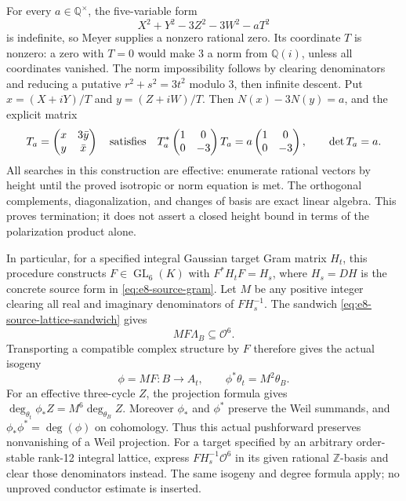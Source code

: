 For every \(a\in\mathbb Q^\times\), the five-variable form
\[
 X^2+Y^2-3Z^2-3W^2-aT^2
\]
is indefinite, so Meyer supplies a nonzero rational zero.
Its coordinate \(T\) is nonzero: a zero with \(T=0\) would make
3 a norm from \(\mathbb Q(i)\), unless all coordinates vanished.
The norm impossibility follows by clearing denominators and reducing
a putative \(r^2+s^2=3t^2\) modulo 3, then infinite descent.
Put \(x=(X+iY)/T\) and \(y=(Z+iW)/T\). Then
\(N(x)-3N(y)=a\), and the explicit matrix
\begin{equation}\label{eq:e8-binary-transport}
 T_a=\begin{pmatrix}x&3\bar y\\y&\bar x\end{pmatrix}
 \quad\hbox{satisfies}\quad
 T_a^*\begin{pmatrix}1&0\\0&-3\end{pmatrix}T_a
     =a\begin{pmatrix}1&0\\0&-3\end{pmatrix},\qquad
 \det T_a=a.
\end{equation}
All searches in this construction are effective: enumerate rational
vectors by height until the proved isotropic or norm equation is met.
The orthogonal complements, diagonalization, and changes of basis are
exact linear algebra. This proves termination; it does not assert a
closed height bound in terms of the polarization product alone.

In particular, for a specified integral Gaussian target Gram matrix
\(H_t\), this procedure constructs \(F\in\operatorname{GL}_6(K)\)
with \(F^*H_tF=H_s\), where \(H_s=DH\) is the concrete source form
in \eqref{eq:e8-source-gram}. Let \(M\) be any positive integer
clearing all real and imaginary denominators of \(FH_s^{-1}\).
The sandwich \eqref{eq:e8-source-lattice-sandwich} gives
\[
 MF\Lambda_B\subseteq\mathcal O^6.
\]
Transporting a compatible complex structure by \(F\) therefore gives
the actual isogeny
\[
 \phi=MF:B\longrightarrow A_t,\qquad
 \phi^*\theta_t=M^2\theta_B.
\]
For an effective three-cycle \(Z\), the projection formula gives
\(\deg_{\theta_t}\phi_*Z=M^6\deg_{\theta_B}Z\).
Moreover \(\phi_*\) and \(\phi^*\) preserve the Weil summands,
and \(\phi_*\phi^*=\deg(\phi)\) on cohomology. Thus this actual
pushforward preserves nonvanishing of a Weil projection.
For a target specified by an arbitrary order-stable rank-12 integral
lattice, express \(FH_s^{-1}\mathcal O^6\) in its given rational
\(\mathbb Z\)-basis and clear those denominators instead. The same
isogeny and degree formula apply; no unproved conductor estimate is
inserted.

